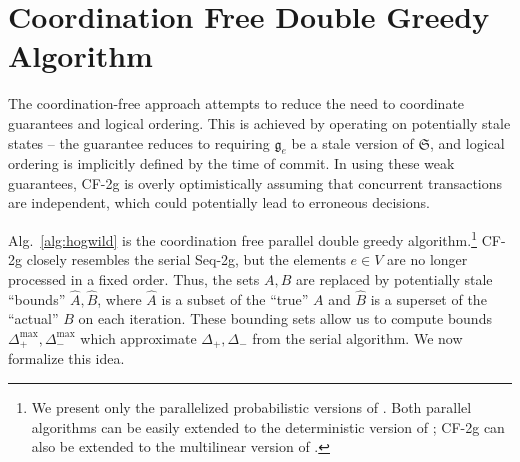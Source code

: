 \documentclass{article} %
\newcommand{\hogwild}{CF-2g}
\newcommand{\seqalg}{Seq-2g}
\newcommand{\Comments}{1}
\newcommand{\note}[2]{\ifnum\Comments=1\textcolor{#1}{#2}\fi}
\newcommand{\xinghao}[1]{\note{red}{[XP: #1]}}
\newcommand{\algref}[1]{Alg.~\ref{#1}}
\begin{document}
\section{Coordination Free Double Greedy Algorithm \label{sec:alghogwild}}
The coordination-free approach attempts to reduce the need to coordinate guarantees and logical ordering.
This is achieved by operating on potentially stale states -- the guarantee reduces to requiring $\mathfrak{g}_e$ be a stale version of $\mathfrak{S}$, and logical ordering is implicitly defined by the time of commit.
In using these weak guarantees, \hogwild{} is overly optimistically assuming that concurrent transactions are independent, which could potentially lead to erroneous decisions.

\algref{alg:hogwild} is the coordination free parallel double greedy algorithm.\footnote{We present only the parallelized probabilistic versions of \cite{buchbinder2012}. Both parallel algorithms can be easily extended to the deterministic version of \cite{buchbinder2012}; \hogwild{} can also be extended to the multilinear version of \cite{buchbinder2012}.}
\hogwild{} closely resembles the serial \seqalg{}, but the elements $e \in V$ are no longer processed in a fixed order.  Thus, the sets $A, B$ are replaced by potentially stale ``bounds'' $\hat{A}, \hat{B}$, where $\hat{A}$ is a subset of the ``true'' $A$ and $\hat{B}$ is a superset of the ``actual'' $B$ on each iteration.
These bounding sets allow us to compute bounds $\Delta_{+}^{\max}, \Delta_{-}^{\max}$ which approximate $\Delta_{+}, \Delta_{-}$ from the serial algorithm.
We now formalize this idea.
\end{document}
